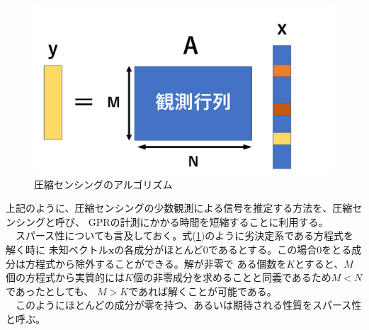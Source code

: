 \documentclass[12pt,a4paper]{jsreport}
\begin{document}
\begin{figure}[h]
  \begin{center}
      \includegraphics[width=12cm]{./slide_image/compressiveSensingImage.png}

      \caption{圧縮センシングのアルゴリズム}\label{CompressiveSensingImage}
  \end{center}
\end{figure}


  
上記のように、圧縮センシングの少数観測による信号を推定する方法を、圧縮センシングと呼び、
GPRの計測にかかる時間を短縮することに利用する。
\\　スパース性についても言及しておく。式(\ref{CompressiveSensingImage})のように劣決定系である方程式を解く時に
未知ベクトル$\bm{x}$の各成分がほとんど$0$であるとする。この場合$0$をとる成分は方程式から除外することができる。解が非零で
ある個数を$K$とすると、$M$個の方程式から実質的には$K$個の非零成分を求めることと同義であるため$M<N$であったとしても、
$M>K$であれば解くことが可能である\cite{sparseModeling}。
\\　このようにほとんどの成分が零を持つ、あるいは期待される性質をスパース性と呼ぶ。
\end{document}
